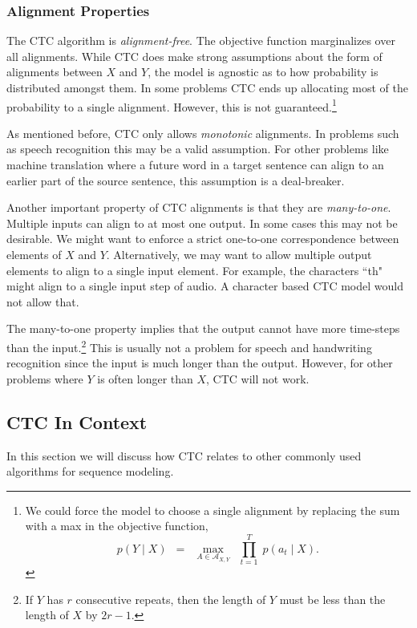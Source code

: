 \subsubsection{Alignment Properties}

The CTC algorithm is {\it alignment-free}. The objective function marginalizes
over all alignments. While CTC does make strong assumptions about the form of
alignments between $X$ and $Y$, the model is agnostic as to how probability is
distributed amongst them. In some problems CTC ends up allocating most of the
probability to a single alignment. However, this is not guaranteed.\footnote{We
could force the model to choose a single alignment by replacing the sum with a
max in the objective function,
\[
p(Y \mid X) \enspace = \enspace \max_{A \in \mathcal{A}_{X,Y}} \enspace \prod_{t=1}^T \; p(a_t \mid X).
\]
}

As mentioned before, CTC only allows {\it monotonic} alignments. In problems
such as speech recognition this may be a valid assumption. For other problems
like machine translation where a future word in a target sentence can align to
an earlier part of the source sentence, this assumption is a deal-breaker.

Another important property of CTC alignments is that they are {\it
many-to-one}. Multiple inputs can align to at most one output. In some cases
this may not be desirable. We might want to enforce a strict one-to-one
correspondence between elements of $X$ and $Y$. Alternatively, we may want to
allow multiple output elements to align to a single input element. For example,
the characters ``th" might align to a single input step of audio. A character
based CTC model would not allow that.

The many-to-one property implies that the output cannot have more time-steps
than the input.\footnote{If $Y$ has $r$ consecutive repeats, then the length of
$Y$ must be less than the length of $X$ by $2r - 1$.} This is usually not a
problem for speech and handwriting recognition since the input is much longer
than the output. However, for other problems where $Y$ is often longer than
$X$, CTC will not work.

\subsection{CTC In Context}

In this section we will discuss how CTC relates to other commonly used
algorithms for sequence modeling.

